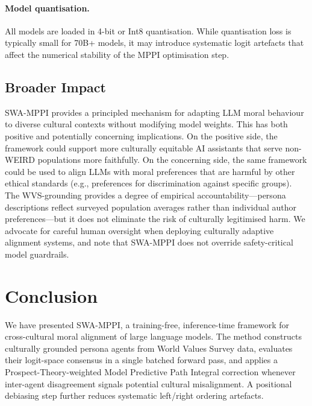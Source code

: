 \documentclass{article}
\begin{document}
\paragraph{Model quantisation.}
All models are loaded in 4-bit or Int8 quantisation. While quantisation loss is typically
small for 70B+ models, it may introduce systematic logit artefacts that affect the
numerical stability of the MPPI optimisation step.

\subsection{Broader Impact}
\label{sec:analysis:impact}

SWA-MPPI provides a principled mechanism for adapting LLM moral behaviour to diverse
cultural contexts without modifying model weights. This has both positive and potentially
concerning implications. On the positive side, the framework could support more culturally
equitable AI assistants that serve non-WEIRD populations more faithfully. On the
concerning side, the same framework could be used to align LLMs with moral preferences
that are harmful by other ethical standards (e.g., preferences for discrimination against
specific groups). The WVS-grounding provides a degree of empirical accountability---persona
descriptions reflect surveyed population averages rather than individual author
preferences---but it does not eliminate the risk of culturally legitimised harm. We
advocate for careful human oversight when deploying culturally adaptive alignment systems,
and note that SWA-MPPI does not override safety-critical model guardrails.

\section{Conclusion}
\label{sec:conclusion}

We have presented SWA-MPPI, a training-free, inference-time framework for cross-cultural
moral alignment of large language models. The method constructs culturally grounded
persona agents from World Values Survey data, evaluates their logit-space consensus in
a single batched forward pass, and applies a Prospect-Theory-weighted Model Predictive
Path Integral correction whenever inter-agent disagreement signals potential cultural
misalignment. A positional debiasing step further reduces systematic left/right ordering
artefacts.
\end{document}
